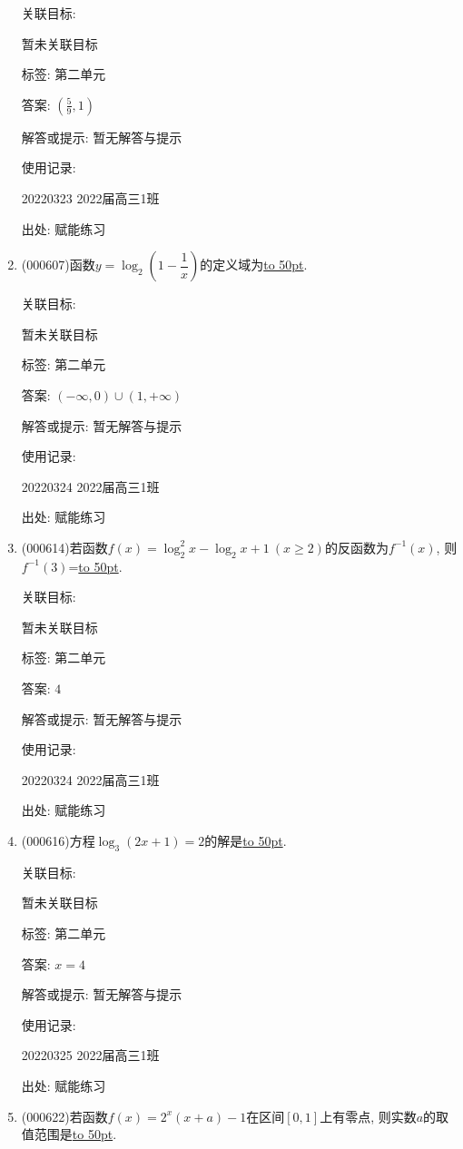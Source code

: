 \documentclass[10pt,a4paper]{article}
\newcommand{\blank}[1]{\underline{\hbox to #1pt{}}}
\begin{document}
\begin{enumerate}[1.]
关联目标:

暂未关联目标



标签: 第二单元

答案: $(\frac 59,1)$

解答或提示: 暂无解答与提示

使用记录:

20220323	2022届高三1班	


出处: 赋能练习
\item { (000607)}函数$y=\log_2(1-\dfrac1x)$的定义域为\blank{50}.


关联目标:

暂未关联目标



标签: 第二单元

答案: $(-\infty ,0)\cup (1,+\infty)$

解答或提示: 暂无解答与提示

使用记录:

20220324	2022届高三1班	


出处: 赋能练习
\item { (000614)}若函数$f(x)=\log_2^2x-\log_2 x+1 \ (x\ge 2)$的反函数为$f^{-1}(x)$, 则$f^{-1}(3)$=\blank{50}.


关联目标:

暂未关联目标



标签: 第二单元

答案: $4$

解答或提示: 暂无解答与提示

使用记录:

20220324	2022届高三1班	


出处: 赋能练习
\item { (000616)}方程$\log_3(2x+1)=2$的解是\blank{50}.


关联目标:

暂未关联目标



标签: 第二单元

答案: $x=4$

解答或提示: 暂无解答与提示

使用记录:

20220325	2022届高三1班	


出处: 赋能练习
\item { (000622)}若函数$f(x)=2^x(x+a)-1$在区间$[0,1]$上有零点, 则实数$a$的取值范围是\blank{50}.



\end{enumerate}
\end{document}

